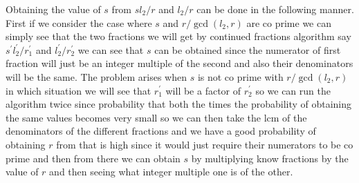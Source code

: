 \documentclass{report}
\begin{document}
Obtaining the value of $s$ from $sl_2/r$ and $l_2/r$ can be done in the following manner. First if we consider the case where $s$ and $r/\gcd(l_2,r)$ are co prime we can simply see that the two fractions we will get by continued fractions algorithm say $s^{'}l_2^{'}/r_1^{'}$ and $l_2^{'}/r_2^{'}$ we can see that $s$ can be obtained since the numerator of first fraction will just be an integer multiple of the second and also their denominators will be the same. The problem arises when $s$ is not co prime with $r/\gcd(l_2,r)$ in which situation we will see that $r_{1}^{'}$ will be a factor of $r_{2}^{'}$ so we can run the algorithm twice since probability that both the times the probability of obtaining the same values becomes very small so we can then take the lcm of the denominators of the different fractions and we have a good probability of obtaining $r$ from that is high since it would just require their numerators to be co prime and then from there we can obtain $s$ by multiplying know fractions by the value of $r$ and then seeing what integer multiple one is of the other.
\end{document}
